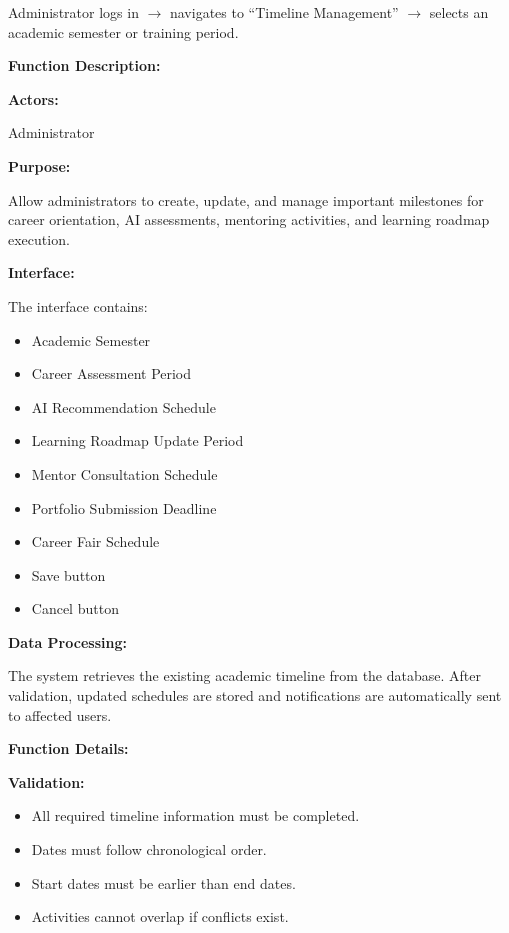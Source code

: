 Administrator logs in $\rightarrow$ navigates to ``Timeline Management'' $\rightarrow$ selects an academic semester or training period.

\vspace{0.3cm}

\textbf{Function Description:}

\textbf{Actors:}

Administrator

\vspace{0.2cm}

\textbf{Purpose:}

Allow administrators to create, update, and manage important milestones for career orientation, AI assessments, mentoring activities, and learning roadmap execution.

\vspace{0.2cm}

\textbf{Interface:}

The interface contains:

\begin{itemize}
    \item Academic Semester
    \item Career Assessment Period
    \item AI Recommendation Schedule
    \item Learning Roadmap Update Period
    \item Mentor Consultation Schedule
    \item Portfolio Submission Deadline
    \item Career Fair Schedule
    \item Save button
    \item Cancel button
\end{itemize}

\vspace{0.2cm}

\textbf{Data Processing:}

The system retrieves the existing academic timeline from the database. After validation, updated schedules are stored and notifications are automatically sent to affected users.

\vspace{0.3cm}

\textbf{Function Details:}

\textbf{Validation:}

\begin{itemize}
    \item All required timeline information must be completed.
    \item Dates must follow chronological order.
    \item Start dates must be earlier than end dates.
    \item Activities cannot overlap if conflicts exist.
\end{itemize}

